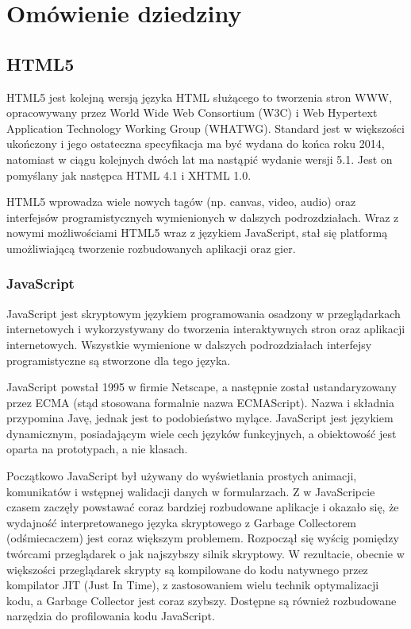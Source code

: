 \chapter{Omówienie dziedziny}
\label{cha:omowienieDziedziny}

\section{HTML5}
\label{sec:html5}
HTML5 jest kolejną wersją języka HTML służącego to tworzenia stron WWW,
opracowywany przez World Wide Web Consortium (W3C) i Web Hypertext Application
Technology Working Group (WHATWG). Standard jest w większości ukończony i jego ostateczna
specyfikacja ma być wydana do końca roku 2014, natomiast w ciągu kolejnych dwóch lat
ma nastąpić wydanie wersji 5.1. Jest on pomyślany jak następca HTML 4.1 i XHTML 1.0.

HTML5 wprowadza wiele nowych tagów (np. canvas, video, audio) oraz interfejsów programistycznych
wymienionych w dalszych podrozdziałach. 
Wraz z nowymi możliwościami HTML5 wraz z językiem JavaScript, stał się platformą
umożliwiającą tworzenie rozbudowanych aplikacji oraz gier.

\subsection{JavaScript}
\label{ssec:javascript}

JavaScript jest skryptowym językiem programowania osadzony w przeglądarkach internetowych
i wykorzystywany do tworzenia interaktywnych stron oraz aplikacji internetowych.
Wszystkie wymienione w dalszych podrozdziałach interfejsy programistyczne są stworzone
dla tego języka.

JavaScript powstał 1995 w firmie Netscape, a następnie został ustandaryzowany przez ECMA (stąd
stosowana formalnie nazwa ECMAScript). Nazwa i składnia przypomina Javę, jednak jest to podobieństwo
mylące. JavaScript jest językiem dynamicznym, posiadającym wiele cech języków funkcyjnych,
a obiektowość jest oparta na prototypach, a nie klasach.

Początkowo JavaScript był używany do wyświetlania prostych animacji,
komunikatów i wstępnej walidacji danych w formularzach. Z w JavaScripcie czasem zaczęły
powstawać coraz bardziej rozbudowane aplikacje i okazało się, że wydajność interpretowanego
języka skryptowego z Garbage Collectorem (odśmiecaczem) jest coraz większym problemem.
Rozpoczął się wyścig pomiędzy twórcami
przeglądarek o jak najszybszy silnik skryptowy. W rezultacie, obecnie w większości przeglądarek
skrypty są kompilowane do kodu natywnego przez kompilator JIT (Just In Time), z zastosowaniem wielu
technik optymalizacji kodu, a Garbage Collector jest coraz szybszy. Dostępne są również
rozbudowane narzędzia do profilowania kodu JavaScript.

